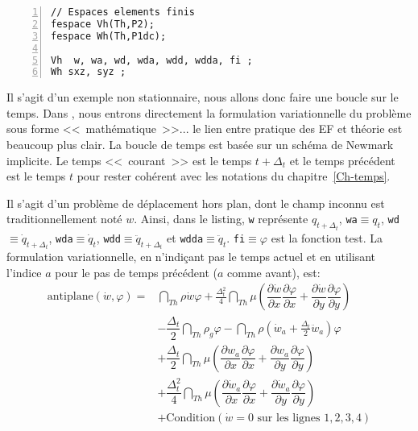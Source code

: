 \color{gris}\scriptsize
\begin{Verbatim}[numbers=left,numbersep=3pt,firstnumber=last]
// Espaces elements finis  
fespace Vh(Th,P2); 
fespace Wh(Th,P1dc);

Vh  w, wa, wd, wda, wdd, wdda, fi ; 
Wh sxz, syz ; 
\end{Verbatim}
\color{black}\normalsize

\medskip
Il s'agit d'un exemple non stationnaire, nous allons donc faire une boucle sur le temps. 
Dans \freefem, nous entrons directement la formulation variationnelle du problème sous forme <<~mathématique~>>... 
le lien entre pratique des EF et théorie est beaucoup plus clair. 
La boucle de temps est basée sur un schéma de Newmark implicite. Le temps <<~courant~>>
est le temps $t+\Delta_t$ et le temps précédent est le temps $t$ pour rester cohérent avec
les notations du chapitre~\ref{Ch-temps}.

Il s'agit d'un problème de déplacement hors plan, dont le champ inconnu est traditionnellement
noté $w$. Ainsi, dans le listing, \verb|w| représente $q_{t+\Delta_t}$, \verb|wa|$\equiv q_t$, 
\verb|wd|$\equiv \dot{q}_{t+\Delta_t}$, \verb|wda|$\equiv \dot{q}_t$, 
\verb|wdd|$\equiv \ddot{q}_{t+\Delta_t}$ et \verb|wdda|$\equiv \ddot{q}_t$. \verb|fi|$\equiv\varphi$
est la fonction test. La formulation variationnelle, en n'indiçant pas le temps actuel et en utilisant l'indice $a$
pour le pas de temps précédent ($a$ comme avant), est:
\begin{equation}
\begin{array}{rl}
\text{antiplane}(\dot{w},\varphi) = &
	\dint_{Th} \rho \dot{w} \varphi + 
		\frac{\Delta_t^2}4 \dint_{Th}  \mu \left( \dfrac{\partial \dot{w}}{\partial x}\dfrac{\partial \varphi}{\partial x} +
		\dfrac{\partial \dot{w}}{\partial y}\dfrac{\partial \varphi}{\partial y}\right)\\[+3ex]
	& - 	\dfrac{\Delta_t}2 \dint_{Th} \rho_g \varphi 
	-  \dint_{Th} \rho\left(\dot{w}_a+\frac{\Delta_t}2 \ddot{w}_a\right)\varphi \\[+3ex]
	& + \dfrac{\Delta_t}2 \dint_{Th} \mu \left( \dfrac{\partial w_a}{\partial x}\dfrac{\partial \varphi}{\partial x}
		+ \dfrac{\partial w_a}{\partial y}\dfrac{\partial \varphi}{\partial y} \right) \\[+3ex]
	& + \dfrac{\Delta_t^2}4 \dint_{Th} \mu \left( \dfrac{\partial \dot{w}_a}{\partial x}\dfrac{\partial \varphi}{\partial x} +
		\dfrac{\partial \dot{w}_a}{\partial y}\dfrac{\partial \varphi}{\partial y} \right) \\[+3ex]
	& + \text{Condition} (\dot{w}=0 \text{ sur les lignes } 1,2,3,4)
\end{array}
\end{equation}

